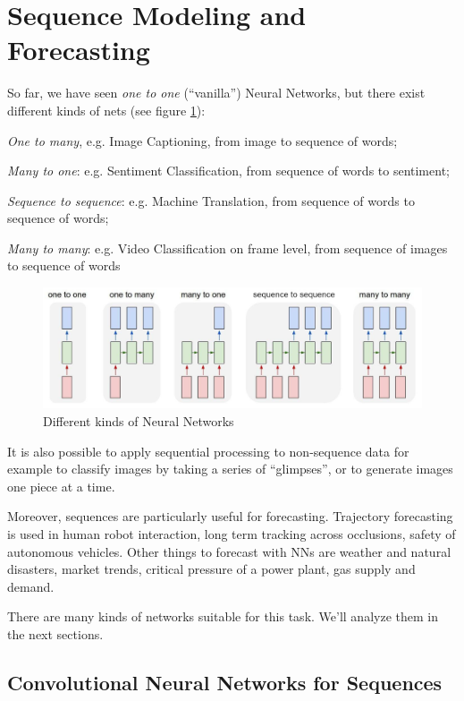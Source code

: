 \section{Sequence Modeling and Forecasting}\label{sec:sequence}

So far, we have seen \textit{one to one} (``vanilla'') Neural Networks, but there exist different kinds of nets (see figure \ref{fig:seq-many}):
\begin{myitem}
    \item \textit{One to many}, e.g. Image Captioning, from image to sequence of words;
    \item \textit{Many to one}: e.g. Sentiment Classification, from sequence of words to sentiment;
    \item \textit{Sequence to sequence}: e.g. Machine Translation, from sequence of words to sequence of words;
    \item \textit{Many to many}: e.g. Video Classification on frame level, from sequence of images to sequence of words
\end{myitem}

\begin{figure}[h!]
    \centering
    \includegraphics[width=0.7\linewidth]{images/many}
    \caption[Different kinds of NN]{Different kinds of Neural Networks}
    \label{fig:seq-many}
\end{figure}

It is also possible to apply sequential processing to non-sequence data for example to classify images by taking a series of ``glimpses'', or to generate images one piece at a time.

Moreover, sequences are particularly useful for forecasting. Trajectory forecasting is used in human robot interaction, long term tracking across occlusions, safety of autonomous vehicles. Other things to forecast with NNs are weather and natural disasters, market trends, critical pressure of a power plant, gas supply and demand.

There are many kinds of networks suitable for this task. We'll analyze them in the next sections.


\subsection{Convolutional Neural Networks for Sequences}\label{sec:seq-cnn}

